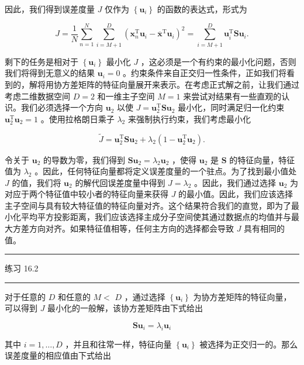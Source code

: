 \documentclass[10pt]{article}
\newcommand{\HRule}{\begin{center}\rule{0.9\linewidth}{0.2mm}\end{center}}
\begin{document}
因此，我们得到误差度量 \(J\) 仅作为 \(\left\{  {\mathbf{u}}_{i}\right\}\) 的函数的表达式，形式为

\[
J = \frac{1}{N}\mathop{\sum }\limits_{{n = 1}}^{N}\mathop{\sum }\limits_{{i = M + 1}}^{D}{\left( {\mathbf{x}}_{n}^{\mathrm{T}}{\mathbf{u}}_{i} - {\overline{\mathbf{x}}}^{\mathrm{T}}{\mathbf{u}}_{i}\right) }^{2} = \mathop{\sum }\limits_{{i = M + 1}}^{D}{\mathbf{u}}_{i}^{\mathrm{T}}\mathbf{S}{\mathbf{u}}_{i}. \tag{16.15}
\]

剩下的任务是相对于 \(\left\{  {\mathbf{u}}_{i}\right\}\) 最小化 \(J\) ，这必须是一个有约束的最小化问题，否则我们将得到无意义的结果 \({\mathbf{u}}_{i} = 0\) 。约束条件来自正交归一性条件，正如我们将看到的，解将用协方差矩阵的特征向量展开来表示。在考虑正式解之前，让我们通过考虑二维数据空间 \(D = 2\) 和一维主子空间 \(M = 1\) 来尝试对结果有一些直观的认识。我们必须选择一个方向 \({\mathbf{u}}_{2}\) 以使 \(J = {\mathbf{u}}_{2}^{\mathrm{T}}\mathbf{S}{\mathbf{u}}_{2}\) 最小化，同时满足归一化约束 \({\mathbf{u}}_{2}^{\mathrm{T}}{\mathbf{u}}_{2} = 1\) 。使用拉格朗日乘子 \({\lambda }_{2}\) 来强制执行约束，我们考虑最小化

\[
\widetilde{J} = {\mathbf{u}}_{2}^{\mathrm{T}}\mathbf{S}{\mathbf{u}}_{2} + {\lambda }_{2}\left( {1 - {\mathbf{u}}_{2}^{\mathrm{T}}{\mathbf{u}}_{2}}\right) . \tag{16.16}
\]

令关于 \({\mathbf{u}}_{2}\) 的导数为零，我们得到 \({\mathbf{{Su}}}_{2} = {\lambda }_{2}{\mathbf{u}}_{2}\) ，使得 \({\mathbf{u}}_{2}\) 是 \(\mathbf{S}\) 的特征向量，特征值为 \({\lambda }_{2}\) 。因此，任何特征向量都将定义误差度量的一个驻点。为了找到最小值处 \(J\) 的值，我们将 \({\mathbf{u}}_{2}\) 的解代回误差度量中得到 \(J = {\lambda }_{2}\) 。因此，我们通过选择 \({\mathbf{u}}_{2}\) 为对应于两个特征值中较小者的特征向量来获得 \(J\) 的最小值。因此，我们应该选择主子空间与具有较大特征值的特征向量对齐。这个结果符合我们的直觉，即为了最小化平均平方投影距离，我们应该选择主成分子空间使其通过数据点的均值并与最大方差方向对齐。如果特征值相等，任何主方向的选择都会导致 \(J\) 具有相同的值。

\HRule

练习 16.2

\HRule

对于任意的 \(D\) 和任意的 \(M <\)  \(D\) ，通过选择 \(\left\{  {\mathbf{u}}_{i}\right\}\) 为协方差矩阵的特征向量，可以得到 \(J\) 最小化的一般解，该协方差矩阵由下式给出

\[
\mathbf{S}{\mathbf{u}}_{i} = {\lambda }_{i}{\mathbf{u}}_{i} \tag{16.17}
\]

其中 \(i = 1,\ldots ,D\) ，并且和往常一样，特征向量 \(\left\{  {\mathbf{u}}_{i}\right\}\) 被选择为正交归一的。那么误差度量的相应值由下式给出
\end{document}
